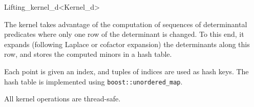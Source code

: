 \begin{ccRefClass}{Lifting_kernel_d<Kernel_d>}

\ccImplementation

The kernel takes advantage of the computation of sequences of determinantal
predicates where only one row of the determinant is changed. To this end,
it expands (following Laplace or cofactor expansion) the determinants along
this row, and stores the computed minors in a hash table.

Each point is given an index, and tuples of indices are used as hash keys.
The hash table is implemented using \verb+boost::unordered_map+.

All kernel operations are thread-safe.

\ccSeeAlso
{}\\

\end{ccRefClass}
